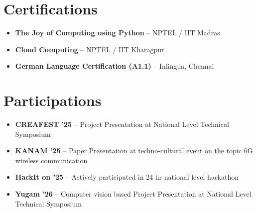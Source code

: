 \documentclass[letterpaper,11pt]{article}
\begin{document}
\section{Certifications}
\begin{itemize}[leftmargin=0.15in, label={}]
  \item \textbf{The Joy of Computing using Python} -- NPTEL / IIT Madras
  \item \textbf{Cloud Computing} -- NPTEL / IIT Kharagpur
  \item \textbf{German Language Certification (A1.1)} -- Inlingua, Chennai
\end{itemize}

\section{Participations}
\begin{itemize}[leftmargin=0.15in, label={}]
  \item \textbf{CREAFEST '25} -- Project Presentation at National Level Technical Symposium
  \item \textbf{KANAM '25} -- Paper Presentation at techno-cultural event on the topic 6G wireless communication
  \item \textbf{HackIt on '25} -- Actively participated in 24 hr national level hackathon
  \item \textbf{Yugam '26} -- Computer vision based Project Presentation at National Level Technical Symposium
\end{itemize}
\end{document}
